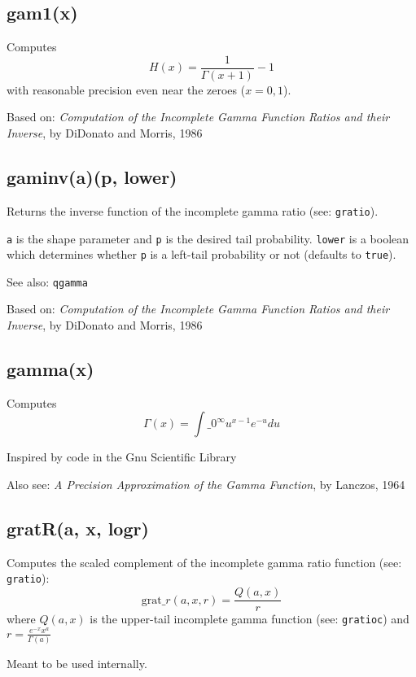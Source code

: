 \documentclass{article}
\begin{document}
    \subsection*{gam1(x)}
    Computes $$H(x)=\frac{1}{\Gamma(x+1)} - 1$$ with reasonable precision even near
the zeroes ($x = 0, 1$).


Based on:  \emph{Computation of the Incomplete Gamma Function Ratios
and their Inverse}, by DiDonato and Morris, 1986


    \subsection*{gaminv(a)(p, lower)}
    Returns the inverse function
of the incomplete gamma ratio (see: \texttt{gratio}).


\texttt{a} is the shape parameter and \texttt{p} is the desired tail probability.
\texttt{lower} is a boolean which determines whether \texttt{p} is a left-tail
probability or not (defaults to \texttt{true}).


See also: \texttt{qgamma}


Based on:  \emph{Computation of the Incomplete Gamma Function Ratios
and their Inverse}, by DiDonato and Morris, 1986


    \subsection*{gamma(x)}
    Computes $$\Gamma(x) = \int\_0^\infty u^{x-1} e^{-u} du$$


Inspired by code in the Gnu Scientific Library


Also see: \emph{A Precision Approximation of the Gamma Function}, by
Lanczos, 1964


    \subsection*{gratR(a, x, logr)}
    Computes the scaled complement of the incomplete gamma ratio function
(see: \texttt{gratio}): $$\textrm{grat}\_r(a,x,r) =  \frac{Q(a,x)}{r}$$
where
              $Q(a,x)$ is the upper-tail incomplete gamma function
(see: \texttt{gratioc}) and  $r = \frac{e^{-x} x^a}{\Gamma(a)}$


Meant to be used internally.
\end{document}
